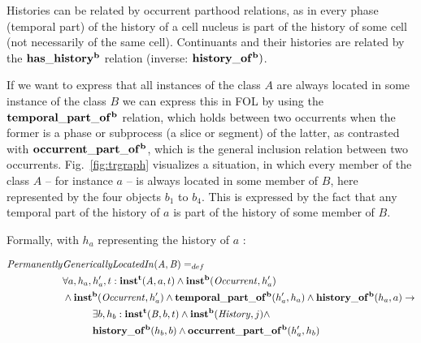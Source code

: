 Histories can be related by occurrent parthood relations, as in every phase (temporal part) 
of the history of a cell nucleus is part of the history of some cell (not necessarily of the same cell).  
Continuants and their histories are related by the $\mathrm{\mathbf{has\_history^b}}$ relation 
(inverse: $\mathrm{\mathbf{history\_of^b}})$.

If we want to express that all instances of the class $A$ are always located in some instance of the 
class $B$ we can express this in FOL by using the $\mathrm{\mathbf{temporal\_part\_of^b}}$ relation, which holds 
between two occurrents when the former is a phase or subprocess (a slice or 
segment) of the latter, as contrasted with $\mathrm{\mathbf{occurrent\_part\_of^b}}$, which is the general inclusion relation between two 
occurrents. Fig.\ \ref{fig:trgraph} visualizes a situation, in which every member of the class $A$ 
-- for instance $a$ -- is always located in some member of $B$, here represented by the 
four objects $b_1$ to $b_4$. This is expressed by the fact that any temporal part of the history of $a$ 
is part of the history of some member of $B$. 


Formally, with $h_a$ representing the history of $a$ :

\begin{equation}
\begin{split}
\mathit{Permanently} & \mathit{GenericallyLocatedIn}(\mathit{A},\mathit{B})  =_{def}  \\
& \forall a, h_a, h_a', t: \mathrm{\mathbf{inst^t}}(\mathit{A}, a, t) \wedge \mathrm{\mathbf{inst^b}}(\mathit{Occurrent},h_a') \\
& \wedge \mathrm{\mathbf{inst^b}}(\mathit{Occurrent},h_a') \wedge \mathrm{\mathbf{temporal\_part\_of^b}}(h_a', h_a) \wedge \mathrm{\mathbf{history\_of^b}}(h_a, a) \rightarrow \\
& \quad \quad \quad \exists b, h_b: \mathrm{\mathbf{inst^t}}(\mathit{B}, b, t) \wedge \mathrm{\mathbf{inst^b}}(\mathit{History},j) \wedge \\
& \quad \quad \quad \mathrm{\mathbf{history\_of^b}}(h_b, b) \wedge  \mathrm{\mathbf{occurrent\_part\_of^b}}(h_a', h_b) 
\end{split}
\label{eq:history:PartOf}
\end{equation}




